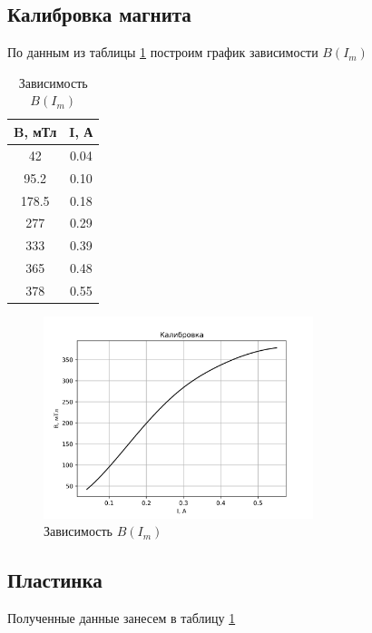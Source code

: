 \documentclass[a4paper, 12pt]{article}
\begin{document}
\subsection*{Калибровка магнита}
По данным из таблицы \ref{tab:cal} построим график зависимости $B(I_m)$
\begin{table}[]
	\centering
	\begin{tabular}{|c|c|}
	\hline
	\textbf{B, мТл} & \textbf{I, А} \\ \hline
	42              & 0.04          \\ \hline
	95.2            & 0.10          \\ \hline
	178.5           & 0.18          \\ \hline
	277             & 0.29          \\ \hline
	333             & 0.39          \\ \hline
	365             & 0.48          \\ \hline
	378             & 0.55          \\ \hline
	\end{tabular}
	\caption{Зависимость $B(I_m)$}
	\label{tab:cal}
\end{table}
\begin{figure}[H]
    \centering
    \includegraphics[width=0.7\textwidth]{calibration.png}
    \caption{Зависимость $B(I_m)$}
    \label{fig:cal}
\end{figure}

\subsection*{Пластинка}

Полученные данные занесем в таблицу \ref{tab:cal}
\end{document}
